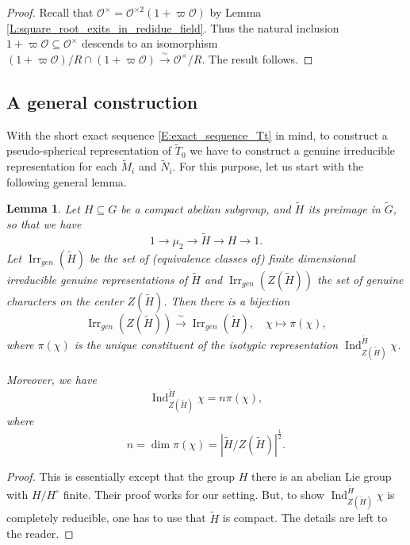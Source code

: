 \documentclass[10pt, letterpaper]{amsart}
\theoremstyle{plain}
\newtheorem{Lem}[equation]{Lemma}
\theoremstyle{definition}
\numberwithin{equation}{section}
\newcommand{\Mt}{\widetilde{M}}
\newcommand{\Nt}{\widetilde{N}}
\newcommand{\Gt}{\widetilde{G}}
\newcommand{\Ht}{\widetilde{H}}
\newcommand{\Tt}{\widetilde{T}}
\newcommand{\Ind}{\operatorname{Ind}}
\newcommand{\Irr}{\operatorname{Irr}}
\newcommand{\Ocal}{\mathcal{O}}
\begin{document}
\begin{proof}
	Recall that $\Ocal^{\times}=\Ocal^{\times 2}(1+\varpi\Ocal)$ by Lemma \ref{L:square_root_exits_in_redidue_field}. Thus the natural inclusion $1+\varpi\Ocal\subseteq\Ocal^{\times}$ descends to an isomorphism $(1+\varpi\Ocal)/R\cap (1+\varpi\Ocal)\xrightarrow{\sim}\Ocal^{\times}/R$. The result follows.
\end{proof}




\subsection{A general construction}


With the short exact sequence \eqref{E:exact_sequence_Tt} in mind, to construct a pseudo-spherical representation of $\Tt_{0}$ we have to construct a genuine irreducible representation for each $\Mt_i$ and $\Nt_i$. For this purpose, let us start with the following general lemma.
\begin{Lem}\label{L:rep_of_2-step_unipotent_group}
Let $H\subseteq G$ be a compact abelian subgroup, and $\Ht$ its preimage in $\Gt$, so that we have
\[
1\longrightarrow\mu_2\longrightarrow\Ht\longrightarrow H\longrightarrow 1.
\]
Let $\Irr_{gen}(\Ht)$ be the set of (equivalence classes of) finite dimensional irreducible genuine representations of $\Ht$ and $\Irr_{gen}(Z(\Ht))$ the set of genuine characters on the center $Z(\Ht)$. Then there is a bijection
\[
\Irr_{gen}(Z(\Ht))\xrightarrow{\;\sim\;}\Irr_{gen}(\Ht),\quad \chi\mapsto \pi(\chi),
\]
where $\pi(\chi)$ is the unique constituent of the isotypic representation $\Ind_{Z(\Ht)}^{\Ht}\chi$. 

Moreover, we have
\[
\Ind_{Z(\Ht)}^{\Ht}\chi=n\pi(\chi),
\]
where
\[
n=\dim\pi(\chi)=\left|\Ht\slash Z(\Ht)\right|^{\frac{1}{2}}.
\]
\end{Lem}
\begin{proof}
This is essentially \cite[Proposition 2.2, p.706]{ABPTV} except that the group $H$ there is an abelian Lie group with $H\slash H^\circ$ finite. Their proof works for our setting. But, to show $\Ind_{Z(\Ht)}^{\Ht}\chi$ is completely reducible, one has to use that $\Ht$ is compact. The details are left to the reader.
\end{proof}
\end{document}
